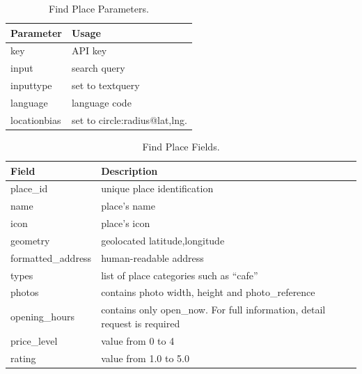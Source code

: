 \begin{table}[htbp]
\centering
\begin{tabularx}{\textwidth}{|l|X|}
\hline
\textbf{Parameter} & \textbf{Usage}                                                    \\ \hline
key                & API key                                                           \\ \hline
input              & search query                                                      \\ \hline
inputtype          & set to textquery                                                  \\ \hline
language           & language code                    \\ \hline
locationbias       & set to circle:radius@lat,lng.                                     \\ \hline
\end{tabularx}
\caption{Find Place Parameters.}
\label{table:gapi-find-place-params}
\end{table}
\begin{table}[htbp]
\centering
\begin{tabularx}{\textwidth}{|l|X|}
\hline
\textbf{Field}     & \textbf{Description}                                                      \\ \hline
place\_id          & unique place identification                                                \\ \hline
name               & place's name                                                              \\ \hline
icon               & place's icon                                                              \\ \hline
geometry           & geolocated latitude,longitude                                             \\ \hline
formatted\_address & human-readable address                                                    \\ \hline
types              & list of place categories such as ``cafe''                                 \\ \hline
photos             & contains photo width, height and photo\_reference                          \\ \hline
opening\_hours     & contains only open\_now. For full information, detail request is required \\ \hline
price\_level       & value from 0 to 4                                                         \\ \hline
rating             & value from 1.0 to 5.0                                                     \\ \hline
\end{tabularx}
\caption{Find Place Fields.}
\label{table:gapi-find-place-fields}
\end{table}
